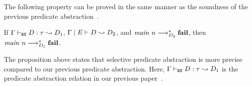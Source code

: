 
The following property can be proved in the same manner as the soundness
of the previous predicate abstraction~\cite{KobayashiPLDI2011}.
\begin{prop}
 If ${\Gamma} \vdash_{\texttt{NS}} {D} : {\tau} \leadsto {D_1}$,
 ${\Gamma} \mid {E} \vdash {D} \leadsto {D_2}$, and
 ${\mathit{main}}~{n} \longrightarrow_{D_2}^* \mathbf{fail}$, then
 ${\mathit{main}}~{n} \longrightarrow_{D_1}^* \mathbf{fail}$.
\end{prop}
The proposition above states that selective predicate abstraction is
more precise compared to our previous predicate abstraction.  Here,
${\Gamma} \vdash_{\texttt{NS}} {D} : {\tau} \leadsto {D_1}$ is the predicate abstraction relation in
our previous paper~\cite{KobayashiPLDI2011}.


%
%
%
%
%
%
%
%
%
%
%
%
%
%
%
%
%
%



